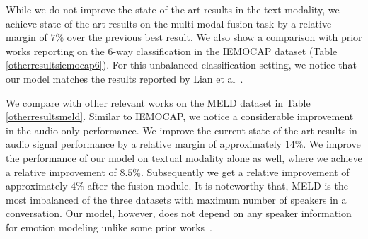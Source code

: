 \documentclass[lettersize,journal]{IEEEtran}
\begin{document}
While we do not improve the state-of-the-art results in the text modality, we achieve state-of-the-art results on the multi-modal fusion task by a relative margin of $7\%$ over the previous best result. We also show a comparison with prior works reporting on the 6-way classification in the IEMOCAP dataset (Table \ref{otherresultsiemocap6}). For this unbalanced classification setting, we notice that our model matches the results reported by Lian et al~\cite{lian2022smin}. 

We compare with other relevant works on the MELD dataset in Table \ref{otherresultsmeld}. Similar to IEMOCAP, we notice a considerable improvement in the audio only performance. We improve the current state-of-the-art results in audio signal performance by a relative margin of approximately $14\%$. We improve the performance of our model on textual modality alone as well, where we achieve a relative improvement of $8.5\%$. Subsequently we get a relative improvement of approximately $4\%$ after the fusion module. It is noteworthy that, MELD is the most imbalanced of the three datasets with maximum number of speakers in a conversation. Our model, however, does not depend on any speaker information for emotion modeling unlike some prior works~\cite{mao2021dialoguetrm}. 
\end{document}
